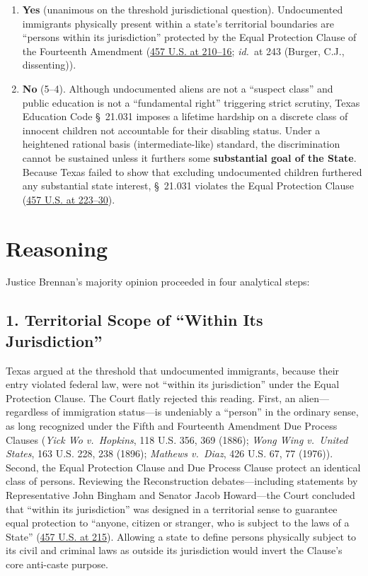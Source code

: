 \documentclass[12pt]{article}
\begin{document}
\begin{enumerate}
    \item \textbf{Yes} (unanimous on the threshold jurisdictional question). Undocumented immigrants physically present within a state's territorial boundaries are ``persons within its jurisdiction'' protected by the Equal Protection Clause of the Fourteenth Amendment (\href{https://www.law.cornell.edu/supremecourt/text/457/202}{457 U.S. at 210--16}; \textit{id.}\ at 243 (Burger, C.J., dissenting)).
    \item \textbf{No} (5--4). Although undocumented aliens are not a ``suspect class'' and public education is not a ``fundamental right'' triggering strict scrutiny, Texas Education Code \S~21.031 imposes a lifetime hardship on a discrete class of innocent children not accountable for their disabling status. Under a heightened rational basis (intermediate-like) standard, the discrimination cannot be sustained unless it furthers some \textbf{substantial goal of the State}. Because Texas failed to show that excluding undocumented children furthered any substantial state interest, \S~21.031 violates the Equal Protection Clause (\href{https://www.law.cornell.edu/supremecourt/text/457/202}{457 U.S. at 223--30}).
\end{enumerate}

\section{Reasoning}

Justice Brennan's majority opinion proceeded in four analytical steps:

\subsection*{1. Territorial Scope of ``Within Its Jurisdiction''}
Texas argued at the threshold that undocumented immigrants, because their entry violated federal law, were not ``within its jurisdiction'' under the Equal Protection Clause. The Court flatly rejected this reading. First, an alien---regardless of immigration status---is undeniably a ``person'' in the ordinary sense, as long recognized under the Fifth and Fourteenth Amendment Due Process Clauses (\textit{Yick Wo v.\ Hopkins}, 118 U.S. 356, 369 (1886); \textit{Wong Wing v.\ United States}, 163 U.S. 228, 238 (1896); \textit{Mathews v.\ Diaz}, 426 U.S. 67, 77 (1976)). Second, the Equal Protection Clause and Due Process Clause protect an identical class of persons. Reviewing the Reconstruction debates---including statements by Representative John Bingham and Senator Jacob Howard---the Court concluded that ``within its jurisdiction'' was designed in a territorial sense to guarantee equal protection to ``anyone, citizen or stranger, who is subject to the laws of a State'' (\href{https://www.law.cornell.edu/supremecourt/text/457/202}{457 U.S. at 215}). Allowing a state to define persons physically subject to its civil and criminal laws as outside its jurisdiction would invert the Clause's core anti-caste purpose.
\end{document}

